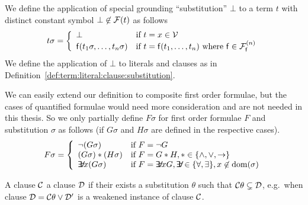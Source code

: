\begin{definition}\label{def:term:literal:clause:substitution}
	We define the application of special grounding “substitution” \( \bot \) to a term \( t \) with distinct constant symbol \( \bot \not\in\mcF(t) \)
	as follows
	\begin{gather*}
	\MDEFINE{t\sigma}{ll}{
			\bot & \text{if }t=x\in\mcV
			\\
			\mf(t_1\sigma,\ldots,t_n\sigma)	&\text{if }t=\mf(t_1,\ldots,t_n)
			\text{ where  }
			 \mf\in\mcFfn
			 }
	\end{gather*}
	We define the application of \( \bot \) to literals and clauses as in
	Definition~\vref{def:term:literal:clause:substitution}.

\end{definition}

\begin{definition}
	We can easily extend our definition to composite first order formulae,
	but the cases of quantified formulae would need more consideration
	and are not needed in this thesis.
	So we only partially define \( F\sigma \) for first order formulae \( F \) and substitution \( \sigma \) as follows (if \( G\sigma \) and \( H\sigma \) are defined in the respective cases).
	\begin{gather*}
	\MDEFINE{F\sigma}{ll}{
		\lnot(G\sigma) & \text{if }F = \lnot G
		\\
		(G\sigma) * (H\sigma) & \text{if }F = G * H, *\in \{ \land, \lor, \limp \}
		\\
		\quantify x (G\sigma) &\text{if }F = \quantify x G,
		\quantify \in \{ \forall, \exists \},
		x\not\in\domain(\sigma)
	}
	\end{gather*}
\end{definition}

\begin{definition}
	A clause \( \mcC \)  a clause \( \mcD \) if their exists a substitution \( \theta \) such that \( \mcC\theta \subsetneq \mcD \),
	e.g.~when clause \( \mcD = \mcC\theta \lor \mcD' \) is a weakened instance of clause \( \mcC \).
\end{definition}

